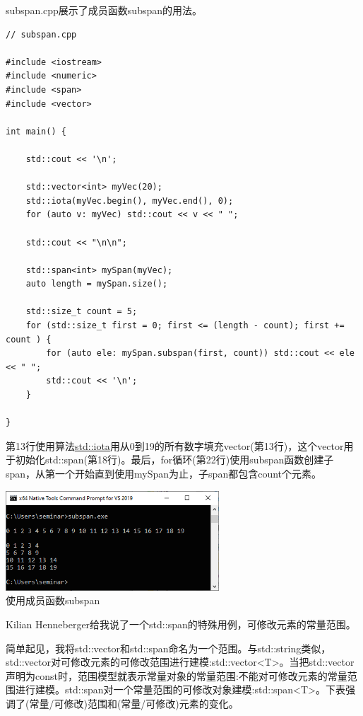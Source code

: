 subspan.cpp展示了成员函数subspan的用法。

\begin{lstlisting}[style=styleCXX]
// subspan.cpp

#include <iostream>
#include <numeric>
#include <span>
#include <vector>

int main() {

	std::cout << '\n';
	
	std::vector<int> myVec(20);
	std::iota(myVec.begin(), myVec.end(), 0);
	for (auto v: myVec) std::cout << v << " ";
	
	std::cout << "\n\n";
	
	std::span<int> mySpan(myVec);
	auto length = mySpan.size();
	
	std::size_t count = 5;
	for (std::size_t first = 0; first <= (length - count); first += count ) {
		for (auto ele: mySpan.subspan(first, count)) std::cout << ele << " ";
		std::cout << '\n';
	}

}
\end{lstlisting}

第13行使用算法\href{https://en.cppreference.com/w/cpp/algorithm/iota}{std::iota}用从0到19的所有数字填充vector(第13行)，这个vector用于初始化std::span(第18行)。最后，for循环(第22行)使用subspan函数创建子span，从第一个开始直到使用mySpan为止，子span都包含count个元素。

\begin{center}
\includegraphics[width=0.6\textwidth]{content/3/chapter5/images/8.png}\\
使用成员函数subspan
\end{center}

Kilian Henneberger给我说了一个std::span的特殊用例，可修改元素的常量范围。


简单起见，我将std::vector和std::span命名为一个范围。与std::string类似，std::vector对可修改元素的可修改范围进行建模:std::vector<T>。当把std::vector声明为const时，范围模型就表示常量对象的常量范围:不能对可修改元素的常量范围进行建模。std::span对一个常量范围的可修改对象建模:std::span<T>。下表强调了(常量/可修改)范围和(常量/可修改)元素的变化。

